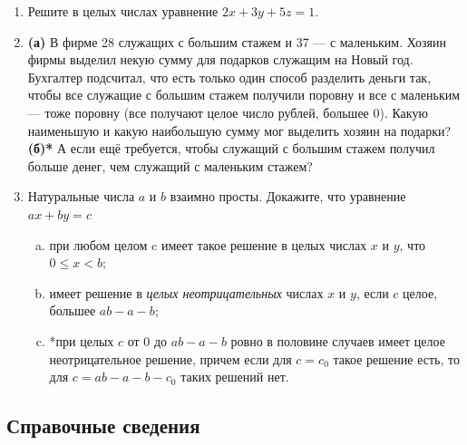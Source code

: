 \begin{enumerate}
\item Решите в целых числах уравнение $2x + 3y + 5z = 1$.

\item \textbf{(а)} В фирме 28 служащих с большим стажем и 37 --- с маленьким. Хозяин фирмы выделил
 некую сумму для подарков служащим на Новый год. Бухгалтер подсчитал, что есть только
один способ разделить деньги так, чтобы все служащие с большим стажем получили поровну и все
с маленьким --- тоже поровну (все получают целое число рублей, большее 0). Какую наименьшую
и какую наибольшую сумму мог выделить хозяин на подарки? \textbf{(б)*} А если ещё требуется, чтобы
служащий с большим стажем получил больше денег, чем служащий с маленьким стажем?

\item Натуральные числа $a$ и $b$ взаимно просты. Докажите, что уравнение $ax + by = c$
\begin{enumerate}[a)]
\item при любом целом c имеет такое решение в целых числах $x$ и $y$, что $0 \le x < b$;
\item имеет решение в \textit{целых неотрицательных} числах $x$ и $y$, если $c$ целое, большее $ab - a - b$;
\item *при целых $c$ от 0 до $ab - a - b$ ровно в половине случаев имеет целое неотрицательное решение,
причем если для $c = c_0$ такое решение есть, то для $c = ab - a - b - c_0$ таких решений нет.
\end{enumerate}


\end{enumerate}

\subsection*{Справочные сведения}

